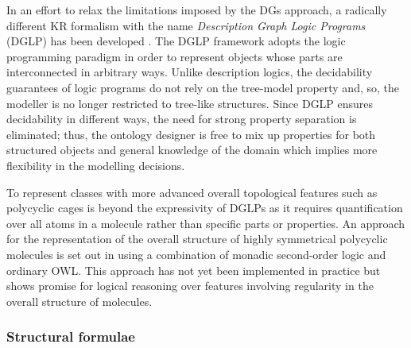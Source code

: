 \documentclass[10pt]{bmc_article}
\newenvironment{bmcformat}{\baselineskip20pt\sloppy\setboolean{publ}{false}}{\baselineskip20pt\sloppy}
\begin{document}
\begin{bmcformat}
In an effort to relax the limitations imposed by the DGs approach, a radically different KR formalism with the name \emph{Description Graph Logic Programs} (DGLP) has been developed \cite{magka2011}. The DGLP framework adopts the logic programming paradigm in order to represent objects whose parts are interconnected in arbitrary ways. Unlike description logics, the decidability guarantees of logic programs do not rely on the tree-model property and, so, the modeller is no longer restricted to tree-like structures. Since DGLP ensures decidability in different ways, the need for strong property separation is eliminated; thus, the ontology designer is free to mix up properties for both structured objects and general knowledge of the domain which implies more flexibility in the  modelling decisions.  


% 
%  
% 

To represent classes with more advanced overall topological features such as polycyclic cages is beyond the expressivity of DGLPs as it requires quantification over all atoms in a molecule rather than specific parts or properties. An approach for the representation of the overall structure of highly symmetrical polycyclic molecules is set out in \cite{hastings2011} using a combination of monadic second-order logic and ordinary OWL.  This approach has not yet been implemented in practice but shows promise for logical reasoning over features involving regularity in the overall structure of molecules. 
  
\subsubsection*{Structural formulae}  
\label{subsubsec:entire}


\end{bmcformat}
\end{document}

